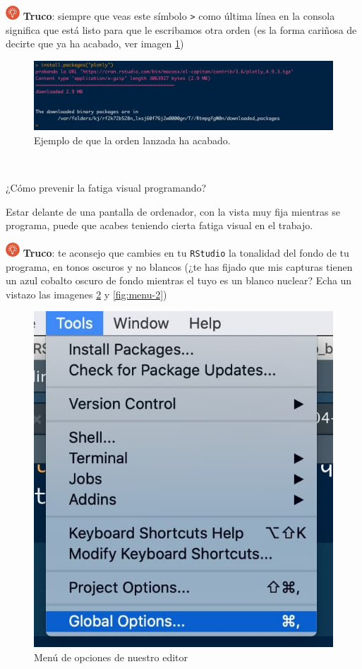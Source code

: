 \documentclass[11pt,]{book}
\begin{document}
\includegraphics[width=0.04\textwidth,height=\textheight]{img/logo_info.png} \textbf{Truco}: siempre que veas este símbolo \texttt{\textgreater{}} como última línea en la consola significa que está listo para que le escribamos otra orden (es la forma cariñosa de decirte que ya ha acabado, ver imagen \ref{fig:tip-consola-lista})

\begin{figure}

{\centering \includegraphics[width=0.7\linewidth]{./img/tip_consola_lista} 

}

\caption{Ejemplo de que la orden lanzada ha acabado.}\label{fig:tip-consola-lista}
\end{figure}

~

¿Cómo prevenir la fatiga visual programando?

Estar delante de una pantalla de ordenador, con la vista muy fija mientras se programa, puede que acabes teniendo cierta fatiga visual en el trabajo.

\includegraphics[width=0.04\textwidth,height=\textheight]{img/logo_info.png} \textbf{Truco}: te aconsejo que cambies en tu \texttt{RStudio} la tonalidad del fondo de tu programa, en tonos oscuros y no blancos (¿te has fijado que mis capturas tienen un azul cobalto oscuro de fondo mientras el tuyo es un blanco nuclear? Echa un vistazo las imagenes \ref{fig:menu-1} y \ref{fig:menu-2})

\begin{figure}

{\centering \includegraphics[width=0.4\linewidth,height=0.4\textheight]{./img/menu_1} 

}

\caption{Menú de opciones de nuestro editor}\label{fig:menu-1}
\end{figure}
\end{document}
